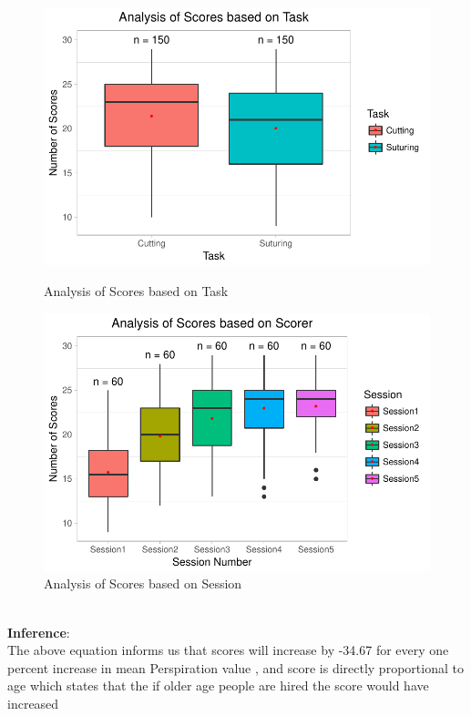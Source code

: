 \documentclass[12pt,epsf]{report}
\begin{document}
\begin{figure}[!htb]
	\begin{minipage}[c]{0.5\linewidth}
	\includegraphics[width=\linewidth]{TaskVsScore.pdf}
	\caption{Analysis of Scores based on Task}
	\end{minipage}
	\hfill
	\begin{minipage}[c]{0.5\linewidth}
	\includegraphics[width=\linewidth]{SessionVsScore.pdf}
	\caption{Analysis of Scores based on Session}
	\end{minipage}
\end{figure}\\
\textbf{Inference}:\\
The above equation informs us that scores will increase by -34.67 for every one percent increase in mean Perspiration value , and score is directly proportional to age which states that the if older age people are hired the score would have increased\\
\\
\FloatBarrier
\end{document}
